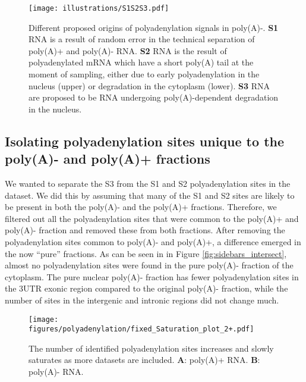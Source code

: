 \begin{figure}[h]
	\begin{center}
		\texttt{[image: illustrations/S1S2S3.pdf]}
	\end{center}
    \caption{Different proposed origins of polyadenylation signals in poly(A)-.
    \textbf{S1} RNA is a result of random error in the technical separation of
    poly(A)+ and poly(A)- RNA. \textbf{S2} RNA is the result of polyadenylated
    mRNA which have a short poly(A) tail at the moment of sampling, either due
    to early polyadenylation in the nucleus (upper) or degradation in the
    cytoplasm (lower). \textbf{S3} RNA are proposed to be RNA undergoing
	poly(A)-dependent degradation in the nucleus.}
	\label{fig:S123}
\end{figure}

\subsection{Isolating polyadenylation sites unique to the poly(A)- and poly(A)+
fractions}
We wanted to separate the S3 from the S1 and S2 polyadenylation sites in the
dataset.  We did this by assuming that many of the S1 and S2 sites are likely
to be present in both the poly(A)- and the poly(A)+ fractions. Therefore, we
filtered out all the polyadenylation sites that were common to the poly(A)+ and
poly(A)- fraction and removed these from both fractions. After removing the
polyadenylation sites common to poly(A)- and poly(A)+, a difference emerged in
the now ``pure'' fractions. As can be seen in in Figure
\ref{fig:sidebars_intersect}, almost no polyadenylation sites were found in the
pure poly(A)- fraction of the cytoplasm. The pure nuclear poly(A)- fraction has
fewer polyadenylation sites in the 3\ppp UTR exonic region compared to the
original poly(A)- fraction, while the number of sites in the intergenic and
intronic regions did not change much.

\begin{figure}[h]
	\begin{center}
		\texttt{[image: figures/polyadenylation/fixed\_Saturation\_plot\_2+.pdf]}
	\end{center}
	\caption{The number of identified polyadenylation sites increases and
	slowly saturates as more datasets are included. \textbf{A}: poly(A)+
	RNA. \textbf{B}: poly(A)- RNA.}
	\label{fig:saturation}
\end{figure}

